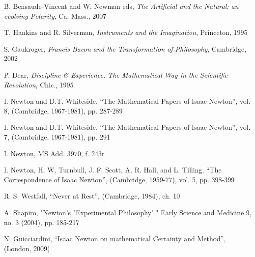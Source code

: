 \documentclass{article}
\begin{document}
\begin{thebibliography}{99}
B. Bensaude-Vincent and W. Newman eds, \emph{The Artificial and the Natural: an evolving Polarity}, Ca. Mass., 2007

T. Hankins and R. Silverman, \emph{Instruments and the Imagination}, Princeton, 1995

S. Gaukroger, \emph{Francis Bacon and the Transformation of Philosophy}, Cambridge, 2002

P. Dear, \emph{Discipline \& Experience. The Mathematical Way in the Scientific Revolution}, Chic., 1995

	I. Newton and D.T. Whiteside, ``The Mathematical Papers of Isaac Newton'', vol. 8, (Cambridge, 1967-1981), pp. 287-289

	I. Newton and D.T. Whiteside, ``The Mathematical Papers of Isaac Newton'', vol. 7, (Cambridge, 1967-1981), pp. 291

	I. Newton, MS Add. 3970, f. 243r

	I. Newton, H. W. Turnbull, J. F. Scott, A. R. Hall, and L. Tilling, ``The Correspondence of Isaac Newton'', (Cambridge, 1959-77), vol. 5,  pp. 398-399

	R. S. Westfall, ``Never at Rest'', (Cambridge, 1984), ch. 10

	A. Shapiro, "Newton's "Experimental Philosophy"." Early Science and Medicine 9, no. 3 (2004), pp. 185-217

	N. Guicciardini, ``Isaac Newton on mathematical Certainty and Method'', (London, 2009) 


\end{thebibliography}
\end{document}
